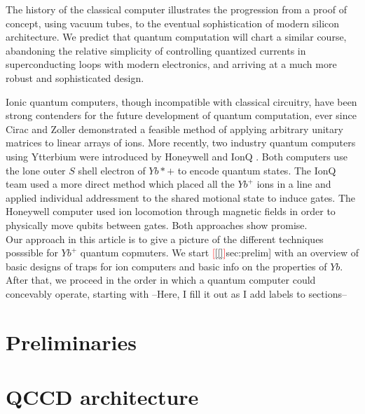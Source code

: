 \documentclass[12pt,a4paper]{amsart}
\numberwithin{equation}{section}
\newcommand{\tosec}[1]{\textcolor{red}{[}\autoref{#1}\textcolor{red}{]}}
\theoremstyle{plain}
\theoremstyle{definition}
\begin{document}
The history of the classical computer illustrates the progression from a proof of concept, using vacuum tubes, to the eventual sophistication of modern silicon architecture. We predict that quantum computation will chart a similar course, abandoning the relative simplicity of controlling quantized currents in superconducting loops with modern electronics, and arriving at a much more robust and sophisticated design.

Ionic quantum computers, though incompatible with classical circuitry, have been strong contenders for the future development of quantum computation, ever since Cirac and Zoller demonstrated a feasible method of applying arbitrary unitary matrices to linear arrays of ions. \cite{fundQuanIoni} More recently, two industry quantum computers using Ytterbium were introduced by Honeywell \cite{rareEartFund} and IonQ \cite{ionq}. Both computers use the lone outer $S$ shell electron of $Yb*+$ to encode quantum states. The IonQ team used a more direct method which placed all the $Yb^+$ ions in a line and applied individual addressment to the shared motional state to induce gates. The Honeywell computer used ion locomotion through magnetic fields in order to physically move qubits between gates. Both approaches show promise.\\
Our approach in this article is to give a picture of the different techniques posssible for $Yb^+$ quantum copmuters. We start \tosec[sec:prelim] with an overview of basic designs of traps for ion computers and basic info on the properties of $Yb$. After that, we proceed in the order in which a quantum computer could concevably operate, starting with --Here, I fill it out as I add labels to sections--

\section{Preliminaries}  \label{sec:prelim}


\section{QCCD architecture} 
\end{document}
